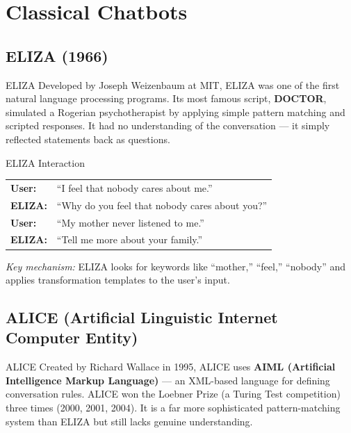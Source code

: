 \documentclass[12pt,a4paper]{report}
\begin{document}
\section{Classical Chatbots}

\subsection{ELIZA (1966)}

\begin{defbox}{ELIZA}
Developed by Joseph Weizenbaum at MIT, ELIZA was one of the first natural language processing programs. Its most famous script, \textbf{DOCTOR}, simulated a Rogerian psychotherapist by applying simple pattern matching and scripted responses. It had no understanding of the conversation --- it simply reflected statements back as questions.
\end{defbox}

\begin{examplebox}{ELIZA Interaction}
\begin{tabular}{ll}
\textbf{User:} & ``I feel that nobody cares about me.'' \\
\textbf{ELIZA:} & ``Why do you feel that nobody cares about you?'' \\[0.2cm]
\textbf{User:} & ``My mother never listened to me.'' \\
\textbf{ELIZA:} & ``Tell me more about your family.'' \\
\end{tabular}

\vspace{0.2cm}
\textit{Key mechanism:} ELIZA looks for keywords like ``mother,'' ``feel,'' ``nobody'' and applies transformation templates to the user's input.
\end{examplebox}

\subsection{ALICE (Artificial Linguistic Internet Computer Entity)}

\begin{defbox}{ALICE}
Created by Richard Wallace in 1995, ALICE uses \textbf{AIML (Artificial Intelligence Markup Language)} --- an XML-based language for defining conversation rules. ALICE won the Loebner Prize (a Turing Test competition) three times (2000, 2001, 2004). It is a far more sophisticated pattern-matching system than ELIZA but still lacks genuine understanding.
\end{defbox}
\end{document}
